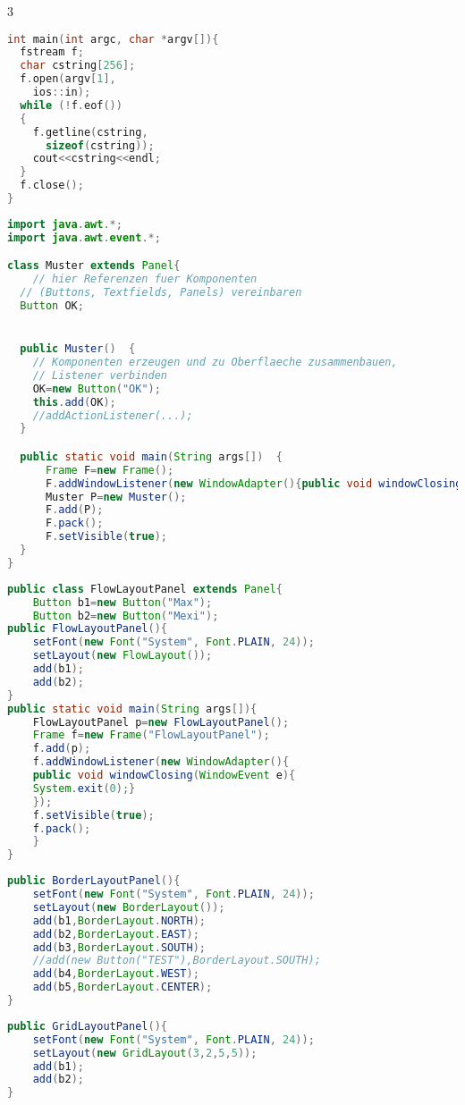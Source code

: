 \begin{multicols*}{3}
\begin{lstlisting}[language=C]
int main(int argc, char *argv[]){
  fstream f;
  char cstring[256];
  f.open(argv[1],
    ios::in);
  while (!f.eof())
  {
    f.getline(cstring, 
      sizeof(cstring));
    cout<<cstring<<endl;
  }
  f.close();
}
\end{lstlisting}
\HRule[4pt]
\begin{lstlisting}[language=Java]
import java.awt.*;
import java.awt.event.*;

class Muster extends Panel{
	// hier Referenzen fuer Komponenten 
  // (Buttons, Textfields, Panels) vereinbaren
  Button OK;


  public Muster()  {
    // Komponenten erzeugen und zu Oberflaeche zusammenbauen,
    // Listener verbinden
    OK=new Button("OK");
    this.add(OK);
    //addActionListener(...);
  }

  public static void main(String args[])  {
      Frame F=new Frame();
      F.addWindowListener(new WindowAdapter(){public void windowClosing(WindowEvent we){System.exit(0);}});
      Muster P=new Muster();
      F.add(P);
      F.pack();
      F.setVisible(true);
  }
}
\end{lstlisting}
\begin{lstlisting}[language=Java]
public class FlowLayoutPanel extends Panel{
	Button b1=new Button("Max");
	Button b2=new Button("Mexi");
public FlowLayoutPanel(){
	setFont(new Font("System", Font.PLAIN, 24));
	setLayout(new FlowLayout());
	add(b1);
	add(b2);
}
public static void main(String args[]){
	FlowLayoutPanel p=new FlowLayoutPanel();
	Frame f=new Frame("FlowLayoutPanel");
	f.add(p);
	f.addWindowListener(new WindowAdapter(){
	public void windowClosing(WindowEvent e){
	System.exit(0);}
	});
	f.setVisible(true);
	f.pack();
	}
}
\end{lstlisting}
\begin{lstlisting}[language=Java]
public BorderLayoutPanel(){
	setFont(new Font("System", Font.PLAIN, 24));
	setLayout(new BorderLayout());
	add(b1,BorderLayout.NORTH);
	add(b2,BorderLayout.EAST);
	add(b3,BorderLayout.SOUTH);
	//add(new Button("TEST"),BorderLayout.SOUTH);
	add(b4,BorderLayout.WEST);
	add(b5,BorderLayout.CENTER);
}
\end{lstlisting}
\begin{lstlisting}[language=Java]
public GridLayoutPanel(){
	setFont(new Font("System", Font.PLAIN, 24));
	setLayout(new GridLayout(3,2,5,5));
	add(b1);
	add(b2);
}
\end{lstlisting}


\end{multicols*}
